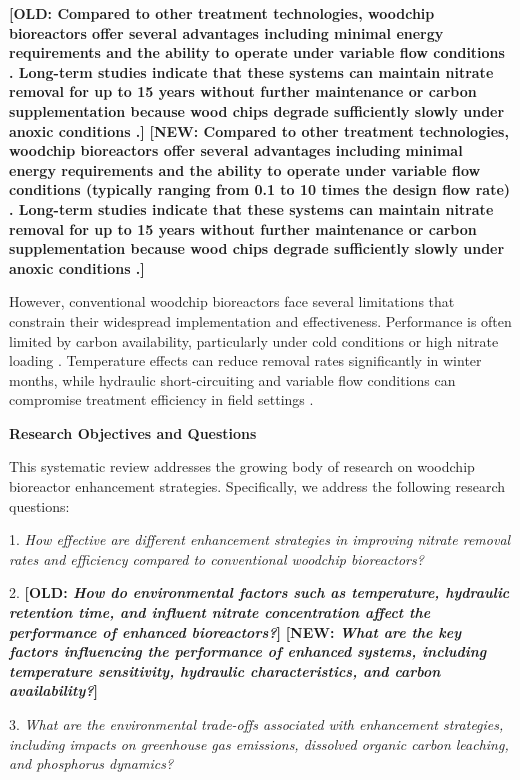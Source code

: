 \documentclass[12pt,a4paper]{article}
\newcommand{\replaced}[2]{\textcolor{deletedtext}{\textbf{[OLD: #1]}} \textcolor{replacedtext}{\textbf{[NEW: #2]}}}
\begin{document}
\replaced{Compared to other treatment technologies, woodchip bioreactors offer several advantages including minimal energy requirements and the ability to operate under variable flow conditions \citep{RN625, RN310}. Long-term studies indicate that these systems can maintain nitrate removal for up to 15 years without further maintenance or carbon supplementation because wood chips degrade sufficiently slowly under anoxic conditions \citep{RN625, RN629}.}{Compared to other treatment technologies, woodchip bioreactors offer several advantages including minimal energy requirements and the ability to operate under variable flow conditions (typically ranging from 0.1 to 10 times the design flow rate) \citep{RN625, RN310}. Long-term studies indicate that these systems can maintain nitrate removal for up to 15 years without further maintenance or carbon supplementation because wood chips degrade sufficiently slowly under anoxic conditions \citep{RN625, RN629}.}

However, conventional woodchip bioreactors face several limitations that constrain their widespread implementation and effectiveness. Performance is often limited by carbon availability, particularly under cold conditions or high nitrate loading \citep{RN625, RN228, RN258}. Temperature effects can reduce removal rates significantly in winter months, while hydraulic short-circuiting and variable flow conditions can compromise treatment efficiency in field settings \citep{RN228, RN309}.

\textbf{Research Objectives and Questions}

This systematic review addresses the growing body of research on woodchip bioreactor enhancement strategies. Specifically, we address the following research questions:

1. \textit{How effective are different enhancement strategies in improving nitrate removal rates and efficiency compared to conventional woodchip bioreactors?}

2. \replaced{\textit{How do environmental factors such as temperature, hydraulic retention time, and influent nitrate concentration affect the performance of enhanced bioreactors?}}{\textit{What are the key factors influencing the performance of enhanced systems, including temperature sensitivity, hydraulic characteristics, and carbon availability?}}

3. \textit{What are the environmental trade-offs associated with enhancement strategies, including impacts on greenhouse gas emissions, dissolved organic carbon leaching, and phosphorus dynamics?}
\end{document}
